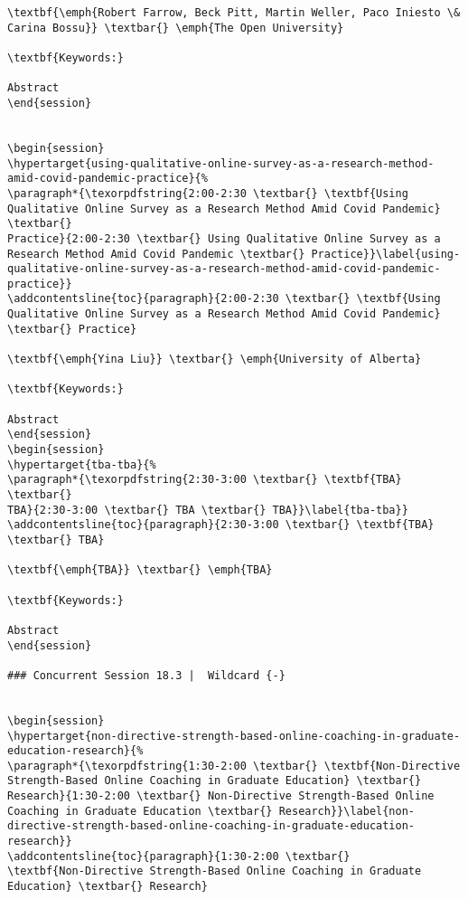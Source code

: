 \documentclass[
]{book}
\begin{document}
\begin{verbatim}
\textbf{\emph{Robert Farrow, Beck Pitt, Martin Weller, Paco Iniesto \&
Carina Bossu}} \textbar{} \emph{The Open University}

\textbf{Keywords:}

Abstract
\end{session}


\begin{session}
\hypertarget{using-qualitative-online-survey-as-a-research-method-amid-covid-pandemic-practice}{%
\paragraph*{\texorpdfstring{2:00-2:30 \textbar{} \textbf{Using
Qualitative Online Survey as a Research Method Amid Covid Pandemic}
\textbar{}
Practice}{2:00-2:30 \textbar{} Using Qualitative Online Survey as a Research Method Amid Covid Pandemic \textbar{} Practice}}\label{using-qualitative-online-survey-as-a-research-method-amid-covid-pandemic-practice}}
\addcontentsline{toc}{paragraph}{2:00-2:30 \textbar{} \textbf{Using
Qualitative Online Survey as a Research Method Amid Covid Pandemic}
\textbar{} Practice}

\textbf{\emph{Yina Liu}} \textbar{} \emph{University of Alberta}

\textbf{Keywords:}

Abstract
\end{session}
\begin{session}
\hypertarget{tba-tba}{%
\paragraph*{\texorpdfstring{2:30-3:00 \textbar{} \textbf{TBA} \textbar{}
TBA}{2:30-3:00 \textbar{} TBA \textbar{} TBA}}\label{tba-tba}}
\addcontentsline{toc}{paragraph}{2:30-3:00 \textbar{} \textbf{TBA}
\textbar{} TBA}

\textbf{\emph{TBA}} \textbar{} \emph{TBA}

\textbf{Keywords:}

Abstract
\end{session}

### Concurrent Session 18.3 |  Wildcard {-}


\begin{session}
\hypertarget{non-directive-strength-based-online-coaching-in-graduate-education-research}{%
\paragraph*{\texorpdfstring{1:30-2:00 \textbar{} \textbf{Non-Directive
Strength-Based Online Coaching in Graduate Education} \textbar{}
Research}{1:30-2:00 \textbar{} Non-Directive Strength-Based Online Coaching in Graduate Education \textbar{} Research}}\label{non-directive-strength-based-online-coaching-in-graduate-education-research}}
\addcontentsline{toc}{paragraph}{1:30-2:00 \textbar{}
\textbf{Non-Directive Strength-Based Online Coaching in Graduate
Education} \textbar{} Research}


\end{verbatim}
\end{document}
